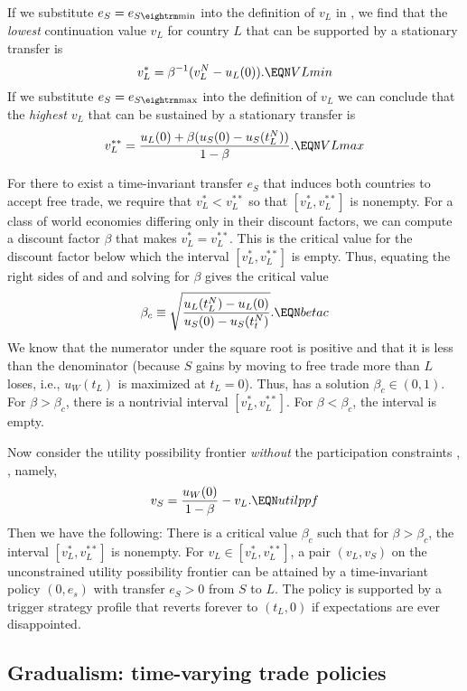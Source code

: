  If we substitute $e_S = e_{S {\rm min}}$ into the definition
of $v_L$ in , we find that the {\it lowest\/}
continuation value $v_L$ for country $L$ that can be supported
by a stationary transfer is
$$ v_L^* = \beta^{-1} (v_L^N - u_L(0)) . \EQN VLmin $$
If we substitute $e_S = e_{S {\rm max}}$ into the definition
of $v_L$ we can conclude that the {\it highest\/} $v_L$ that can be sustained
by a stationary transfer is
$$ v_L^{**} = {u_L(0) + \beta (u_S(0) - u_S(t_L^N)) \over 1 -\beta} .
  \EQN VLmax $$

For there to exist a time-invariant transfer $e_S$ that induces both countries
to accept free trade, we require that
$v_L^* <v_L^{**}$ so that $[v_L^*,v_L^{**}]$ is nonempty.
  For a class of world economies differing only in their
discount factors, we can compute
a discount factor $\beta$ that makes $v_L^* = v_L^{**}$. This
is the critical value for the discount factor below which
the interval $[v_L^*, v_L^{**}]$ is empty. Thus,
equating the right sides of  and  and solving
for $\beta$
gives the critical value
$$ \beta_c \equiv \sqrt{{ u_L(t_L^N) - u_L(0) \over u_S(0) - u_S(t_t^N)}}.
  \EQN betac $$
We know that the numerator under the square root is positive
and that it is less than the denominator (because $S$ gains by
moving to free trade more than $L$ loses, i.e., $u_W(t_L)$ is maximized
at $t_L=0$).  Thus,  has a solution
$\beta_c \in (0,1)$.   For $\beta > \beta_c$,
there is a nontrivial interval $[v_L^*, v_L^{**}]$.
For $\beta < \beta_c$, the interval is empty.

Now consider the utility possibility frontier
{\it without\/} the participation constraints
, , namely,
$$  v_S = {u_W(0) \over 1-\beta} - v_L. \EQN utilppf $$
  Then we have the following:
\medskip
{}
There is a critical value $\beta_c$
such
that for $\beta > \beta_c$, the interval
$[v_L^*, v_L^{**}]$ is nonempty.
 For $v_L \in [v_L^*, v_L^{**}]$, a pair
$(v_L, v_S)$ on the unconstrained utility possibility frontier
 can be attained by a time-invariant  policy $(0, e_s)$ with
transfer $e_S >0$ from $S$ to $L$. The policy is supported by
a trigger strategy  profile that reverts forever to
$(t_L, 0)$ if expectations are ever disappointed.


\subsection{Gradualism: time-varying trade policies}

